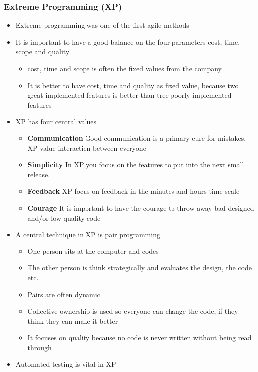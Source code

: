 \documentclass[11pt]{article}
\providecommand{\tightlist}{%
      \setlength{\itemsep}{0pt}\setlength{\parskip}{0pt}}
\begin{document}
\hypertarget{extreme-programming-xp}{%
\subsubsection{Extreme Programming (XP)}\label{extreme-programming-xp}}

\begin{itemize}
\tightlist
\item
  Extreme programming was one of the first agile methods
\item
  It is important to have a good balance on the four parameters cost,
  time, scope and quality

  \begin{itemize}
  \tightlist
  \item
    cost, time and scope is often the fixed values from the company
  \item
    It is better to have cost, time and quality as fixed value, because
    two great implemented features is better than tree poorly
    implemented features
  \end{itemize}
\item
  XP has four central values

  \begin{itemize}
  \tightlist
  \item
    \textbf{Communication} Good communication is a primary cure for
    mistakes. XP value interaction between everyone
  \item
    \textbf{Simplicity} In XP you focus on the features to put into the
    next small release.
  \item
    \textbf{Feedback} XP focus on feedback in the minutes and hours time
    scale
  \item
    \textbf{Courage} It is important to have the courage to throw away
    bad designed and/or low quality code
  \end{itemize}
\item
  A central technique in XP is pair programming

  \begin{itemize}
  \tightlist
  \item
    One person sits at the computer and codes
  \item
    The other person is think strategically and evaluates the design,
    the code etc.
  \item
    Pairs are often dynamic
  \item
    Collective ownership is used so everyone can change the code, if
    they think they can make it better
  \item
    It focuses on quality because no code is never written without being
    read through
  \end{itemize}
\item
  Automated testing is vital in XP


\end{itemize}
\end{document}
